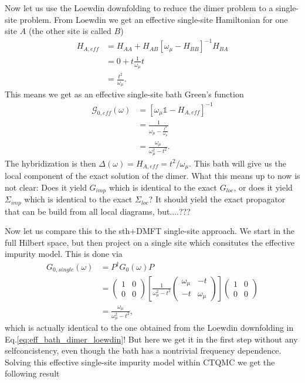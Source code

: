 \documentclass[12pt,a4paper]{scrartcl}
\numberwithin{equation}{section}
\newcommand{\unity}{\mathds{1}}
\begin{document}
Now let us use the Loewdin downfolding to reduce the dimer problem to a single-site problem.
From Loewdin we get an effective single-site Hamiltonian for one site $A$ (the other site is called $B$)
\begin{align}
 H_{A,eff} &= H_{AA} + H_{AB}[ \omega_{\mu} - H_{BB} ]^{-1} H_{BA} \nonumber\\
 &= 0 + t\frac{1}{\omega_{\mu}} t \nonumber\\
 &=  \frac{t^2}{\omega_{\mu}} .
\end{align}
This means we get as an effective single-site bath Green's function
\begin{align}
 \mathcal{G}_{0,eff}(\omega) 
 &= \left[\omega_{\mu} \unity -H_{A,eff}  \right]^{-1} \nonumber \\ 
 &=\frac{1}{\omega_{\mu} -\frac{t^2}{\omega_{\mu}}}  \nonumber \\
 &=\frac{\omega_{\mu}}{ \omega_{\mu}^2 - t^2 }  \label{eq:eff_bath_dimer_loewdin}.
\end{align}
The hybridization is then $\Delta(\omega) =H_{A,eff}  = t^2/\omega_{\mu}$.
This bath will give us the local component of the exact solution of the dimer. What this means up to now
is not clear: Does it yield $G_{imp}$ which is identical to the exact $G_{loc}$, 
or does it yield $\Sigma_{imp}$ which is identical to the exact $\Sigma_{loc}$?
It should yield the exact propagator that can be build from all local diagrams, but....???

\bigskip

Now let us compare this to the sth+DMFT single-site approach.
We start in the full Hilbert space, but then project on a single site
which consitutes the effective impurity model. This is done via
\begin{align}
 G_{0,single}(\omega)
 &= P^{\dagger} G_{0}(\omega) P \nonumber\\
 &= \begin{pmatrix}
     1 & 0 \\ 0 & 0
    \end{pmatrix}
\left[ \frac{1}{\omega_{\mu}^2-t^2} 
   \begin{pmatrix}
     \omega_{\mu} & -t \\ -t  & \omega_{\mu}
    \end{pmatrix} \right]    
    \begin{pmatrix}
     1 & 0 \\ 0 & 0
    \end{pmatrix} \nonumber\\
&=     \frac{\omega_{\mu}}{ \omega_{\mu}^2 - t^2 }  ,
\end{align}
which is actually identical to the one obtained from the Loewdin downfolding in Eq.\eqref{eq:eff_bath_dimer_loewdin}!
But here we get it in the first step without any selfconcistency, even though the bath has a nontrivial frequency dependence.
Solving this effective single-site impurity model within CTQMC we get the following result
\end{document}
